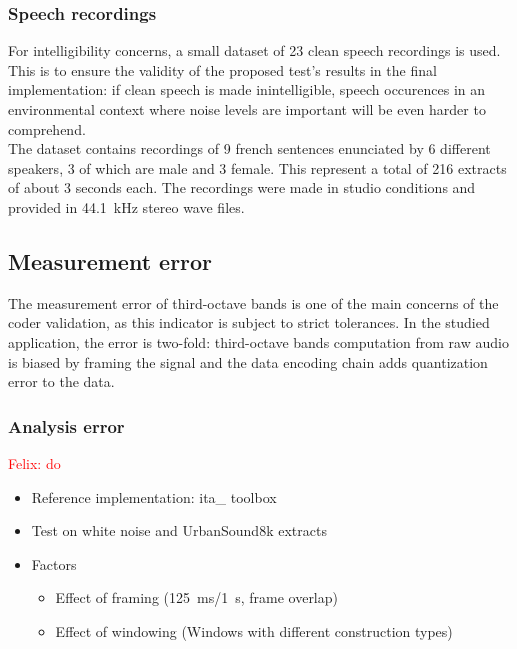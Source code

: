 \documentclass[12pt,times,onecolumn]{article}
\newcommand{\fg}[1]{\textcolor{red}{ Felix: #1}}
\begin{document}
\subsubsection{Speech recordings}
For intelligibility concerns, a small dataset of 23 clean speech recordings is used. This is to ensure the validity of the proposed test's results in the final implementation: if clean speech is made inintelligible, speech occurences in an environmental context where noise levels are important will be even harder to comprehend.\\

The dataset contains recordings of 9 french sentences enunciated by 6 different speakers, 3 of which are male and 3 female. This represent a total of 216 extracts of about 3 seconds each. The recordings were made in studio conditions and provided in 44.1~kHz stereo wave files.


\subsection{Measurement error}
The measurement error of third-octave bands is one of the main concerns of the coder validation, as this indicator is subject to strict tolerances. In the studied application, the error is two-fold: third-octave bands computation from raw audio is biased by framing the signal and the data encoding chain adds quantization error to the data.
\subsubsection{Analysis error}
\fg{do}
\begin{itemize}
\item Reference implementation: ita\_ toolbox
\item Test on white noise and UrbanSound8k extracts
\item Factors
\begin{itemize}
\item Effect of framing (125~ms/1~s, frame overlap)
\item Effect of windowing (Windows with different construction types)
\end{itemize}
\end{itemize}
\end{document}
